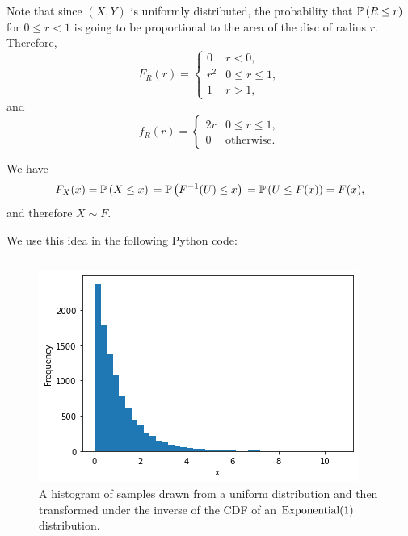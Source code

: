 \begin{ex}
  Note that since $(X,Y)$ is uniformly distributed, the probability that
  $\P{R\leq r}$ for $0\leq r<1$ is going to be proportional to the area of the
  disc of radius $r$. Therefore,
  \[
    F_R(r)=\begin{cases}
      0   & r < 0,          \\
      r^2 & 0\leq r \leq 1, \\
      1   & r > 1,
    \end{cases}
  \]
  and
  \[
    f_R(r)=\begin{cases}
      2r & 0\leq r \leq 1,   \\
      0  & \text{otherwise}.
    \end{cases}
  \]
\end{ex}

\begin{ex}
  We have
  \[
    F_X(x)
    =\P{X\leq x}         \\
    =\P{F^{-1}(U)\leq x} \\
    =\P{U\leq F(x)}
    =F(x),
  \]
  and therefore $X\sim F$.

  We use this idea in the following Python code:
  \inputminted{python}{src/02-15.py}

  \begin{figure}[H]
    \centering
    \includegraphics[scale=0.7]{part1/ch02-15}
    \caption{A histogram of samples drawn from a uniform distribution and then
      transformed under the inverse of the CDF of an $\Exponential(1)$
      distribution.}
  \end{figure}
\end{ex}

